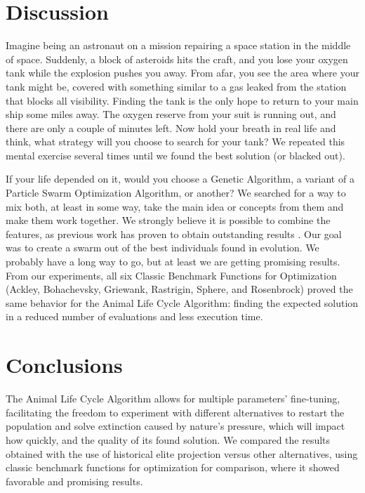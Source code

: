 \documentclass[graybox]{svmult}
\begin{document}
            \FloatBarrier

\section{Discussion}
    \label{section.discussion}

    Imagine being an astronaut on a mission repairing a space station in the
    middle of space. Suddenly, a block of asteroids hits the craft, and you
    lose your oxygen tank while the explosion pushes you away. From afar, you
    see the area where your tank might be, covered with something similar to a
    gas leaked from the station that blocks all visibility. Finding the tank is
    the only hope to return to your main ship some miles away. The oxygen
    reserve from your suit is running out, and there are only a couple of
    minutes left. Now hold your breath in real life and think, what strategy
    will you choose to search for your tank? We repeated this mental exercise
    several times until we found the best solution (or blacked out).

    If your life depended on it, would you choose a Genetic Algorithm, a
    variant of a Particle Swarm Optimization Algorithm, or another? We searched
    for a way to mix both, at least in some way, take the main idea or concepts
    from them and make them work together. We strongly believe it is possible
    to combine the features, as previous work has proven to obtain outstanding
    results \cite{garcia2015evospace,garcia2021event,valdez2021container,valdez2021swarm}.
    Our goal was to create a swarm out of the best individuals found in
    evolution. We probably have a long way to go, but at least we are getting
    promising results. From our experiments, all six Classic Benchmark
    Functions for Optimization (Ackley, Bohachevsky, Griewank, Rastrigin,
    Sphere, and Rosenbrock) proved the same behavior for the Animal Life Cycle
    Algorithm: finding the expected solution in a reduced number of evaluations
    and less execution time.


\section{Conclusions}
    \label{section.conclusions}

    The Animal Life Cycle Algorithm allows for multiple parameters'
    fine-tuning, facilitating the freedom to experiment with different
    alternatives to restart the population and solve extinction caused by
    nature's pressure, which will impact how quickly, and the quality of its
    found solution. We compared the results obtained with the use of historical
    elite projection versus other alternatives, using classic benchmark
    functions for optimization for comparison, where it showed favorable and
    promising results.
\end{document}
